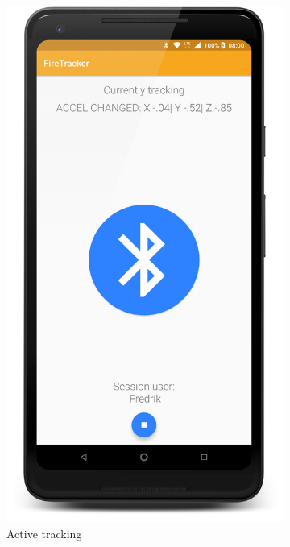 \documentclass[../Main/thesis.tex]{subfiles}
\begin{document}
\begin{figure}[h]
\begin{subfigure}{0.2\textwidth}
		\includegraphics[width=\textwidth]{../fig/firetracker_app_old_3}
		\caption{Active tracking}
		\label{fig:app-first-prototype-tracking}
	\end{subfigure}
	\begin{subfigure}{0.2\textwidth}

\end{subfigure}
\end{figure}
\end{document}
